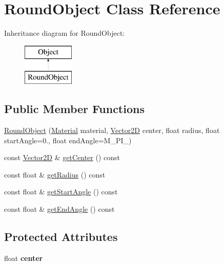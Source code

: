 \hypertarget{class_round_object}{\section{Round\-Object Class Reference}
\label{class_round_object}
}
Inheritance diagram for Round\-Object\-:\begin{figure}[H]
\begin{center}
\leavevmode
\includegraphics[height=2.000000cm]{class_round_object}
\end{center}
\end{figure}
\subsection*{Public Member Functions}
\begin{DoxyCompactItemize}
\item 
\hyperlink{class_round_object_a5ced474e09b2284b3d99380b2cd82d8f}{Round\-Object} (\hyperlink{class_material}{Material} material, \hyperlink{class_vector2_d}{Vector2\-D} center, float radius, float start\-Angle=0., float end\-Angle=M\-\_\-\-P\-I\-\_)
\item 
const \hyperlink{class_vector2_d}{Vector2\-D} \& \hyperlink{class_round_object_a6998fa9d51ab4814ceb242df9e6031b5}{get\-Center} () const 
\item 
const float \& \hyperlink{class_round_object_a754405df28786cd80d50fe911dc220ca}{get\-Radius} () const 
\item 
const float \& \hyperlink{class_round_object_a748fc039f7a76a495c8ee51476d56df1}{get\-Start\-Angle} () const 
\item 
const float \& \hyperlink{class_round_object_a775ee05b5e644b07522dfb3654cfe114}{get\-End\-Angle} () const 
\end{DoxyCompactItemize}
\subsection*{Protected Attributes}
\begin{DoxyCompactItemize}
\item 
\hypertarget{class_round_object_a0a0b04b4676fc85d6e8f03f80541c8f6}{float {\bfseries center}}\label{class_round_object_a0a0b04b4676fc85d6e8f03f80541c8f6}

\end{DoxyCompactItemize}


